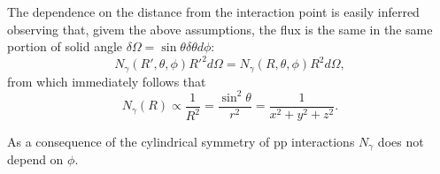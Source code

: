 
The dependence on the distance from the interaction point is easily inferred observing that, givem the above assumptions, 
the flux is the same in the same portion of solid angle $\delta \Omega=\sin \theta\delta\theta d\phi$:%
\begin{equation}
N_{\gamma}(R', \theta, \phi) R'^2 d\Omega = N_{\gamma}(R, \theta, \phi) R^2 d\Omega,
\label{eq:6pre}
\end{equation}
from which immediately follows that
\begin{equation}
N_{\gamma}(R) \propto \frac{1}{R^2} = \frac{\sin^2 \theta}{r^2} = \frac{1}{x^2+y^2+z^2} .
\label{eq:6}
\end{equation}

As a consequence of the cylindrical symmetry of pp interactions
$N_\gamma$ does not depend on $\phi$.

